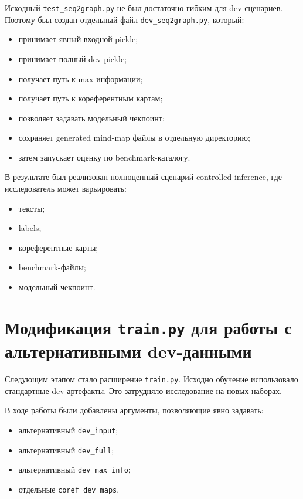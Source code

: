 \documentclass[12pt,a4paper]{article}
\begin{document}
Исходный \texttt{test\_seq2graph.py} не был достаточно гибким для dev-сценариев. Поэтому
был создан отдельный файл \texttt{dev\_seq2graph.py}, который:

\begin{itemize}
    \item принимает явный входной pickle;
    \item принимает полный dev pickle;
    \item получает путь к max-информации;
    \item получает путь к кореферентным картам;
    \item позволяет задавать модельный чекпоинт;
    \item сохраняет generated mind-map файлы в отдельную директорию;
    \item затем запускает оценку по benchmark-каталогу.
\end{itemize}

В результате был реализован полноценный сценарий controlled inference, где исследователь
может варьировать:

\begin{itemize}
    \item тексты;
    \item labels;
    \item кореферентные карты;
    \item benchmark-файлы;
    \item модельный чекпоинт.
\end{itemize}

\section{Модификация \texttt{train.py} для работы с альтернативными dev-данными}

Следующим этапом стало расширение \texttt{train.py}. Исходно обучение использовало
стандартные dev-артефакты. Это затрудняло исследование на новых наборах.

В ходе работы были добавлены аргументы, позволяющие явно задавать:

\begin{itemize}
    \item альтернативный \texttt{dev\_input};
    \item альтернативный \texttt{dev\_full};
    \item альтернативный \texttt{dev\_max\_info};
    \item отдельные \texttt{coref\_dev\_maps}.
\end{itemize}
\end{document}
